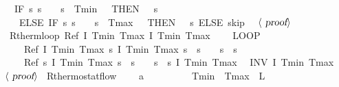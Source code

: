 \documentclass[envcountsame]{llncs}
\begin{document}
\begin{example}
\begin{isabellebody}
\ \ {\isacharparenleft}IF\ {\isacharparenleft}{\isasymlambda}s{\isachardot}\ s{\isachardollar}{}\ {\isacharequal}\ {}\ {\isasymand}\ s{\isachardollar}{}\ {\isasymle}\ Tmin\ {\isacharplus}\ {}{\isacharparenright}\ THEN\ {\isacharparenleft}{}\ {\isacharcolon}{\isacharcolon}{\isacharequal}\ {\isacharparenleft}{\isasymlambda}s{\isachardot}{}{\isacharparenright}{\isacharparenright}\ \isanewline
\ \ \ ELSE\ IF\ {\isacharparenleft}{\isasymlambda}s{\isachardot}\ s{\isachardollar}{}\ {\isacharequal}\ {}\ {\isasymand}\ s{\isachardollar}{}\ {\isasymge}\ Tmax\ {\isacharminus}\ {}{\isacharparenright}\ THEN\ {\isacharparenleft}{}\ {\isacharcolon}{\isacharcolon}{\isacharequal}\ {\isacharparenleft}{\isasymlambda}s{\isachardot}{}{\isacharparenright}{\isacharparenright}\ ELSE\ skip{\isacharparenright}{\isachardoublequoteclose}\isanewline
\ \ $\langle \isa{proof}\rangle$\isanewline
\isanewline
{}\isamarkupfalse%
\ R{\isacharunderscore}therm{\isacharunderscore}loop{\isacharcolon}\ {\isachardoublequoteopen}Ref\ {\isasymlceil}I\ Tmin\ Tmax{\isasymrceil}\ {\isasymlceil}I\ Tmin\ Tmax{\isasymrceil}\ {\isasymge}\ \isanewline
\ \ {\isacharparenleft}LOOP\ \isanewline
\ \ \ \ Ref\ {\isasymlceil}I\ Tmin\ Tmax{\isasymrceil}\ {\isasymlceil}{\isasymlambda}s{\isachardot}\ I\ Tmin\ Tmax\ s\ {\isasymand}\ s{\isachardollar}{}\ {\isacharequal}\ {}\ {\isasymand}\ s{\isachardollar}{}\ {\isacharequal}\ s{\isachardollar}{}{\isasymrceil}{\isacharsemicolon}\isanewline
\ \ \ \ Ref\ {\isasymlceil}{\isasymlambda}s{\isachardot}\ I\ Tmin\ Tmax\ s\ {\isasymand}\ s{\isachardollar}{}\ {\isacharequal}\ {}\ {\isasymand}\ s{\isachardollar}{}\ {\isacharequal}\ s{\isachardollar}{}{\isasymrceil}\ {\isasymlceil}I\ Tmin\ Tmax{\isasymrceil}\isanewline
\ \ INV\ I\ Tmin\ Tmax{\isacharparenright}{\isachardoublequoteclose}\isanewline
\ \ $\langle \isa{proof}\rangle$\isanewline
\isanewline
{}\isamarkupfalse%
\ R{\isacharunderscore}thermostat{\isacharunderscore}flow{\isacharcolon}\ \isanewline
\ \ \ {\isachardoublequoteopen}a\ {\isachargreater}\ {}{\isachardoublequoteclose}\ \ {\isachardoublequoteopen}{}\ {\isasymle}\ {\isasymtau}{\isachardoublequoteclose}\ \ {\isachardoublequoteopen}{}\ {\isacharless}\ Tmin{\isachardoublequoteclose}\ \ {\isachardoublequoteopen}Tmax\ {\isacharless}\ L{\isachardoublequoteclose}\isanewline

\end{isabellebody}
\end{example}
\end{document}
